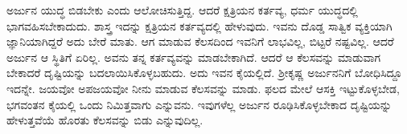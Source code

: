 ಅರ್ಜುನ ಯುದ್ಧ ಬಿಡಬೇಕು ಎಂದು ಆಲೋಚಿಸುತ್ತಿದ್ದ. ಆದರೆ ಕ್ಷತ್ರಿಯನ ಕರ್ತವ್ಯ, ಧರ್ಮ ಯುದ್ಧದಲ್ಲಿ ಭಾಗವಹಿಸಬೇಕಾದುದು. ಶಾಸ್ತ್ರ ಇದನ್ನು ಕ್ಷತ್ರಿಯನ ಕರ್ತವ್ಯದಲ್ಲಿ ಹೇಳುವುದು. ಇವನು ದೊಡ್ಡ ಸಾತ್ವಿಕ ವ್ಯಕ್ತಿಯಾಗಿ ಜ್ಞಾನಿಯಾಗಿದ್ದರೆ ಅದು ಬೇರೆ ಮಾತು. ಆಗ ಮಾಡುವ ಕೆಲಸದಿಂದ ಇವನಿಗೆ ಲಾಭವಿಲ್ಲ, ಬಿಟ್ಟರೆ ನಷ್ಟವಿಲ್ಲ. ಆದರೆ ಅರ್ಜುನ ಆ ಸ್ಥಿತಿಗೆ ಏರಿಲ್ಲ. ಅವನು ತನ್ನ ಕರ್ತವ್ಯವನ್ನು ಮಾಡಬೇಕಾಗಿದೆ. ಆದರೆ ಆ ಕೆಲಸವನ್ನು ಮಾಡುವಾಗ ಬೇಕಾದರೆ ದೃಷ್ಟಿಯನ್ನು ಬದಲಾಯಿಸಿಕೊಳ್ಳಬಹುದು. ಅದು ಇವನ ಕೈಯಲ್ಲಿದೆ. ಶ್ರೀಕೃಷ್ಣ ಅರ್ಜುನನಿಗೆ ಬೋಧಿಸಿದ್ದೂ ಇದನ್ನೇ. ಜಯವೋ ಅಪಜಯವೋ ನೀನು ಮಾಡುವ ಕೆಲಸವನ್ನು ಮಾಡು. ಫಲದ ಮೇಲೆ ಆಸಕ್ತಿ ಇಟ್ಟುಕೊಳ್ಳಬೇಡ, ಭಗವಂತನ ಕೈಯಲ್ಲಿ ಒಂದು ನಿಮಿತ್ತವಾಗು ಎನ್ನುವನು. ಇವುಗಳೆಲ್ಲ ಅರ್ಜುನ ರೂಢಿಸಿಕೊಳ್ಳಬೇಕಾದ ದೃಷ್ಟಿಯನ್ನು ಹೇಳುತ್ತವೆಯೆ ಹೊರತು ಕೆಲಸವನ್ನು ಬಿಡು ಎನ್ನುವುದಿಲ್ಲ.

